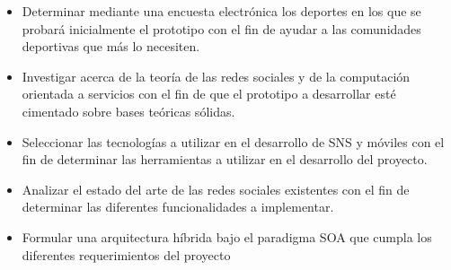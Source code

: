 \begin{itemize}
  \item Determinar mediante una encuesta electrónica los deportes en los que se probará inicialmente el prototipo con el fin de ayudar a las comunidades deportivas que más lo necesiten.
  
  \item Investigar acerca de la teoría de las redes sociales y de la computación orientada a servicios con el fin de que el prototipo a desarrollar esté cimentado sobre
bases teóricas sólidas.

  \item Seleccionar las tecnologías a utilizar en el desarrollo de SNS y móviles con el fin de determinar las herramientas a utilizar en el desarrollo del proyecto.

  \item Analizar el estado del arte de las redes sociales existentes con el fin de determinar las diferentes funcionalidades a implementar.

  \item Formular una arquitectura híbrida bajo el paradigma SOA que cumpla los diferentes requerimientos del proyecto
\end{itemize}
